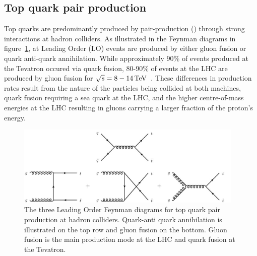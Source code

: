 
\subsection{Top quark pair production}\label{subsec:ttbarTheory}
Top quarks are predominantly produced by pair-production (\ttbar) through strong interactions at hadron colliders.
As illustrated in the Feynman diagrams in figure~\ref{fig:feyn_ttbar}, at Leading Order (LO) \ttbar events are produced by either gluon fusion or quark anti-quark annihilation. 
While approximately 90\% of \ttbar events produced at the Tevatron occured via quark fusion, 80-90\% of \ttbar events at the LHC are produced by gluon fusion for $\sqrt{s} = 8-14\,\text{Te\hspace{-.08em}V}$~\cite{Deliot:2011np,Patrignani:2016xqp}.
These differences in production rates result from the nature of the particles being collided at both machines, \ie quark fusion requiring a sea quark at the LHC, and the higher centre-of-mass energies at the LHC resulting in gluons carrying a larger fraction of the proton's energy.

\begin{figure}[htbp]
\begin{center}
\includegraphics[width=0.97\textwidth]{figs/top-physics/ttbar_feyn.jpg}
\caption{The three Leading Order Feynman diagrams for top quark pair production at hadron colliders. Quark-anti quark annihilation is illustrated on the top row and gluon fusion on the bottom. Gluon fusion is the main production mode at the LHC and quark fusion at the Tevatron.}
\label{fig:feyn_ttbar}
\end{center}
\end{figure}


